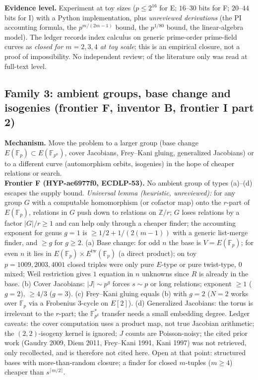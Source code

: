 \documentclass[11pt,a4paper]{article}
\theoremstyle{remark}
\newcommand{\F}{\mathbb{F}}
\begin{document}
\textbf{Evidence level.} Experiment at toy sizes ($p\le2^{16}$ for E; $16$--$30$ bits for F; $20$--$44$ bits for I) with a Python implementation, plus \emph{unreviewed derivations} (the PI accounting formula, the $p^{m/(2m-1)}$ bound, the $p^{1/80}$ bound, the linear-algebra model). The ledger records index calculus on generic prime-order prime-field curves as \emph{closed for $m=2,3,4$ at toy scale}; this is an empirical closure, not a proof of impossibility. No independent review; of the literature only \cite{PKM16} was read at full-text level.

\subsection{Family 3: ambient groups, base change and isogenies (frontier F, inventor B, frontier I part 2)}
\textbf{Mechanism.} Move the problem to a larger group (base change $E(\F_p)\subset E(\F_{p^n})$, cover Jacobians, Frey--Kani gluing, generalized Jacobians) or to a different curve (automorphism orbits, isogenies) in the hope of cheaper relations or search.\\
\textbf{Frontier F (\mbox{HYP-ae6977f0}, ECDLP-53).} No ambient group of types (a)--(d) escapes the supply bound. \emph{Universal lemma (heuristic, unreviewed):} for any group $G$ with a computable homomorphism (or cofactor map) onto the $r$-part of $E(\F_p)$, relations in $G$ push down to relations on $\mathbb Z/r$; $G$ loses relations by a factor $|G|/r\ge1$ and can help only through a cheaper finder; the accounting exponent for genus $g=1$ is $\ge 1/2+1/(2(m-1))$ with a generic list-merge finder, and $\ge g$ for $g\ge2$. (a) Base change: for odd $n$ the base is $V=E(\F_p)$; for even $n$ it lies in $E(\F_p)\times E^{\mathrm{tw}}(\F_p)$ (a direct product); on toy $p=1009,2003,4001$ closed triples were only pure $E$-type or pure twist-type, $0$ mixed; Weil restriction gives $1$ equation in $n$ unknowns since $R$ is already in the base. (b) Cover Jacobians: $|J|\sim p^g$ forces $s\sim p$ or long relations; exponent $\ge1$ ($g=2$), $\ge4/3$ ($g=3$). (c) Frey--Kani gluing equals (b) with $g=2$ ($N=2$ works over $\F_p$ via a Frobenius $3$-cycle on $E[2]$). (d) Generalized Jacobians: the torus is irrelevant to the $r$-part; the $\F_{p^k}^*$ transfer needs a small embedding degree. Ledger caveats: the cover computation uses a product map, not true Jacobian arithmetic; the $(2,2)$-isogeny kernel is ignored; $J$ counts are Poisson-noisy; the cited prior work (Gaudry 2009, Diem 2011, Frey--Kani 1991, Kani 1997) was not retrieved, only recollected, and is therefore not cited here. Open at that point: structured bases with more-than-random closure; a finder for closed $m$-tuples ($m\ge4$) cheaper than $s^{\lceil m/2\rceil}$.\\
\end{document}
